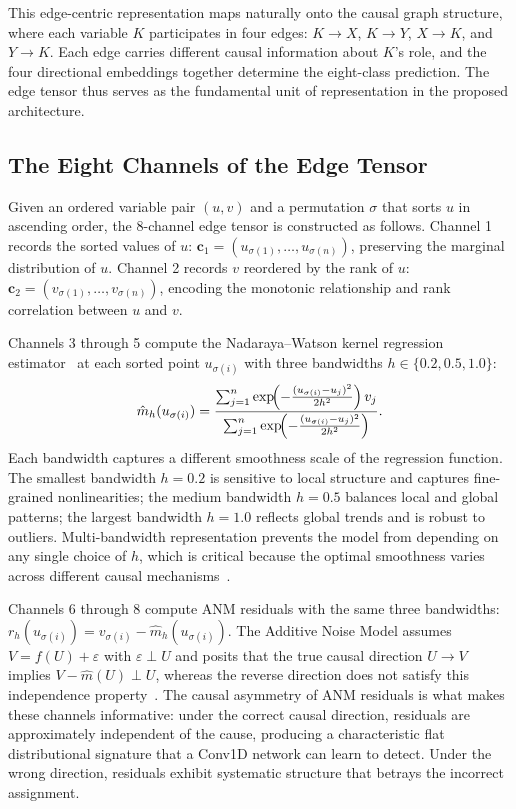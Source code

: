 This edge-centric representation maps naturally onto the causal graph structure, where each variable $K$ participates in four edges: $K\to X$, $K\to Y$, $X\to K$, and $Y\to K$. Each edge carries different causal information about $K$'s role, and the four directional embeddings together determine the eight-class prediction. The edge tensor thus serves as the fundamental unit of representation in the proposed architecture.

\subsection{The Eight Channels of the Edge Tensor}
\label{sec:eight_channels}

Given an ordered variable pair $(u,v)$ and a permutation $\sigma$ that sorts $u$ in ascending order, the 8-channel edge tensor is constructed as follows. Channel 1 records the sorted values of $u$: $\mathbf{c}_1=(u_{\sigma(1)},\ldots,u_{\sigma(n)})$, preserving the marginal distribution of $u$. Channel 2 records $v$ reordered by the rank of $u$: $\mathbf{c}_2=(v_{\sigma(1)},\ldots,v_{\sigma(n)})$, encoding the monotonic relationship and rank correlation between $u$ and $v$.

Channels 3 through 5 compute the Nadaraya--Watson kernel regression estimator~\cite{nadaraya1964, watson1964} at each sorted point $u_{\sigma(i)}$ with three bandwidths $h\in\{0.2,0.5,1.0\}$:
\begin{equation}
\hat{m}_h(u_{\sigma(i)}) = \frac{\sum_{j=1}^{n}\exp\!\Bigl(-\frac{(u_{\sigma(i)}-u_j)^2}{2h^2}\Bigr)\,v_j}{\sum_{j=1}^{n}\exp\!\Bigl(-\frac{(u_{\sigma(i)}-u_j)^2}{2h^2}\Bigr)}.
\label{eq:nadaraya_watson}
\end{equation}
Each bandwidth captures a different smoothness scale of the regression function. The smallest bandwidth $h=0.2$ is sensitive to local structure and captures fine-grained nonlinearities; the medium bandwidth $h=0.5$ balances local and global patterns; the largest bandwidth $h=1.0$ reflects global trends and is robust to outliers. Multi-bandwidth representation prevents the model from depending on any single choice of $h$, which is critical because the optimal smoothness varies across different causal mechanisms~\cite{watson1964}.

Channels 6 through 8 compute ANM residuals with the same three bandwidths: $r_h(u_{\sigma(i)})=v_{\sigma(i)}-\hat{m}_h(u_{\sigma(i)})$. The Additive Noise Model assumes $V=f(U)+\varepsilon$ with $\varepsilon\perp U$ and posits that the true causal direction $U\to V$ implies $V-\hat{m}(U)\perp U$, whereas the reverse direction does not satisfy this independence property~\cite{shimizu2006lingam, hoyer2009anm}. The causal asymmetry of ANM residuals is what makes these channels informative: under the correct causal direction, residuals are approximately independent of the cause, producing a characteristic flat distributional signature that a Conv1D network can learn to detect. Under the wrong direction, residuals exhibit systematic structure that betrays the incorrect assignment.

